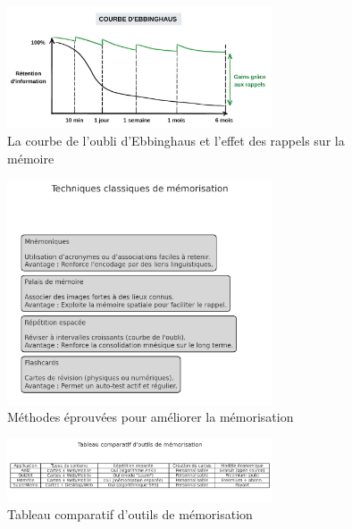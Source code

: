\documentclass[11pt,a4paper]{report}
\begin{document}
\begin{figure}[h]
    \centering
    \includegraphics[width=0.7\textwidth]{images/1.2.3.png}
    \caption{La courbe de l'oubli d'Ebbinghaus et l'effet des rappels sur la mémoire}
    \label{fig:1.2.3_2}
\end{figure}

\begin{figure}[h]
    \centering
    \includegraphics[width=0.7\textwidth]{images/1.3.1_2.png}
    \caption{Méthodes éprouvées pour améliorer la mémorisation}
    \label{fig:1.3.1_2}
\end{figure}

\begin{figure}[h]
    \centering
    \includegraphics[width=0.7\textwidth]{images/1.3.2_2.png}
    \caption{Tableau comparatif d'outils de mémorisation}
    \label{fig:1.3.2_2}
\end{figure}
\end{document}
